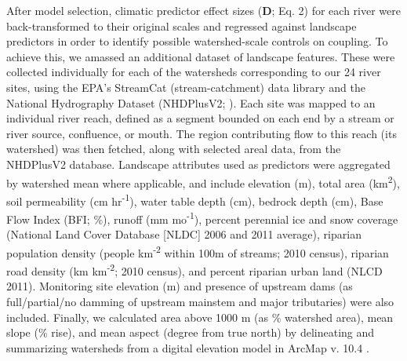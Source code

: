 \documentclass[notitlepage]{article}
\begin{document}
After model selection, climatic predictor effect sizes (\textbf{D}; Eq. 2) for each river were back-transformed to their original scales and regressed against landscape predictors in order to identify possible watershed-scale controls on coupling. To achieve this, we amassed an additional dataset of landscape features. These were collected individually for each of the watersheds corresponding to our 24 river sites, using the EPA's StreamCat (stream-catchment) data library \citep{hill2016stream} and the National Hydrography Dataset (NHDPlusV2; \citealt{mckay2012nhdplus}). Each site was mapped to an individual river reach, defined as a segment bounded on each end by a stream or river source, confluence, or mouth. The region contributing flow to this reach (its watershed) was then fetched, along with selected areal data, from the NHDPlusV2 database. Landscape attributes used as predictors were aggregated by watershed mean where applicable, and include elevation (m), total area (km\textsuperscript{2}), soil permeability (cm hr\textsuperscript{-1}), water table depth (cm), bedrock depth (cm), Base Flow Index (BFI; \%), runoff (mm mo\textsuperscript{-1}), percent perennial ice and snow coverage (National Land Cover Database [NLDC] 2006 and 2011 average), riparian population density (people km\textsuperscript{-2} within 100m of streams; 2010 census), riparian road density (km km\textsuperscript{-2}; 2010 census), and percent riparian urban land (NLCD 2011). Monitoring site elevation (m) and presence of upstream dams (as full/partial/no damming of upstream mainstem and major tributaries) were also included. Finally, we calculated area above 1000 m (as \% watershed area), mean slope (\% rise), and mean aspect (degree from true north) by delineating and summarizing watersheds from a digital elevation model in ArcMap v. 10.4 \citep{arcviewenvironmental}.
\end{document}
